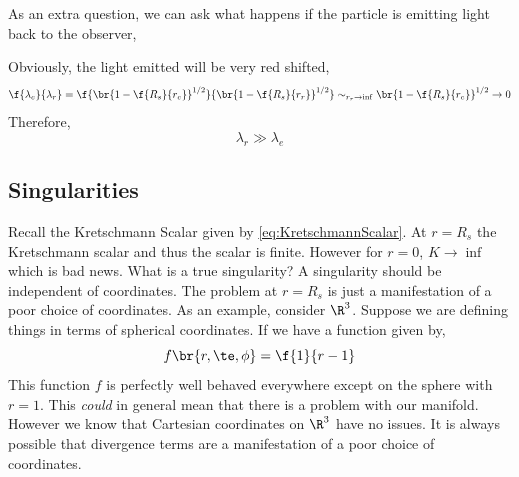 \documentclass{article}
\begin{document}
As an extra question, we can ask what happens if the particle is emitting light back to the observer,

\begin{center}
\end{center}

Obviously, the light emitted will be very red shifted,
\[ \f{\lambda_e}{\lambda_r} = \f{\br{1- \f{R_s}{r_e}}^{1/2}}{\br{1- \f{R_s}{r_r}}^{1/2}} \sim_{r_r \to \inf} \br{1 -\f{R_s}{r_e}}^{1/2} \to 0  \]
Therefore,
\[ \lambda_r \gg \lambda_e \]

\subsection{Singularities}

Recall the Kretschmann Scalar given by \eqref{eq:KretschmannScalar}. At $r = R_s$ the Kretschmann scalar and thus the scalar is finite. However for $r = 0$, $K \to \inf$ which is bad news. What is a true singularity? A singularity should be independent of coordinates. The problem at $r = R_s$ is just a manifestation of a poor choice of coordinates. As an example, consider $\R^3$. Suppose we are defining things in terms of spherical coordinates. If we have a function given by,
\[ f\br{r,\te,\phi} = \f{1}{r-1} \]
This function $f$ is perfectly well behaved everywhere except on the sphere with $r = 1$. This \textit{could} in general mean that there is a problem with our manifold. However we know that Cartesian coordinates on $\R^3$ have no issues. It is always possible that divergence terms are a manifestation of a poor choice of coordinates.\\
\end{document}
